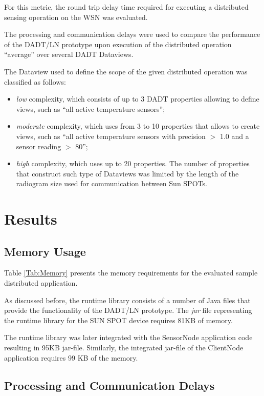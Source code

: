 For this metric, the round trip delay time required for
executing a distributed sensing operation on the WSN was evaluated.  

The processing and communication delays were used to compare the performance of
the DADT/LN prototype upon execution of the distributed operation ``average''
over several DADT Dataviews.

The Dataview used to define the scope of the given distributed operation was classified as follows:
\begin{itemize}
\item \emph{low} complexity, which consists of up to 3 DADT properties allowing to define
views, such as ``all active temperature sensors'';
\item \emph{moderate} complexity, which uses from 3 to 10 properties that allows to
create views, such as ``all active temperature
sensors with precision $>$ 1.0 and a sensor reading $>$ 80'';
\item \emph{high} complexity, which uses up to 20 properties. The number of properties that construct such type of Dataviews was
limited by the length of the radiogram size used for communication between Sun SPOTs.
\end{itemize}

\section{Results}

\subsection{Memory Usage}

Table \ref{Tab:Memory} presents the memory requirements for the evaluated sample
distributed application.


As discussed before, the runtime library consists of a number
of Java files that provide the functionality of the DADT/LN prototype. The \emph{jar} file representing the runtime
library for the SUN SPOT device requires 81KB of memory. 

The runtime library was later integrated with the SensorNode application code 
resulting in 95KB jar-file. Similarly, the integrated jar-file of the ClientNode
application requires 99 KB of the memory.

\subsection{Processing and Communication Delays}

